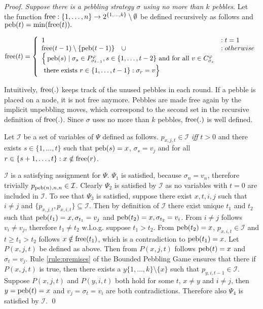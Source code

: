 \begin{proof}
\emph{Suppose there is a pebbling strategy $\sigma$ using no more than $k$ pebbles}. Let the function $\operatorname{free}: \{1,\ldots,n\} \rightarrow 2^{\{1,\ldots,k\}} \setminus \emptyset$ be defined recursively as follows and $\operatorname{peb}(t) = \min(\operatorname{free}(t)).$

$$
\operatorname{free}(t) = \left\{
  \begin{array}{ll}
    1 & : t = 1\\
    \operatorname{free}(t-1) \setminus \{\operatorname{peb}(t-1)\} \quad \cup & : otherwise\\
		\Big\{\operatorname{peb}(s) \mid \sigma_{s} \in P_{\sigma_{t-1}}^{\varphi}, s \in \{1,\ldots,t-2\} \text{ and for all } v \in C_{\sigma_{s}}^{\varphi}&\\
		\text{ there exists } r \in \{1,\ldots,t-1\}: \sigma_{r} = v \Big\}&
  \end{array}
\right.
$$

Intuitively, $\operatorname{free}(.)$ keeps track of the unused pebbles in each round.
If a pebble is placed on a node, it is not free anymore.
Pebbles are made free again by the implicit unpebbling moves, which correspond to the second set in the recursive definition of $\operatorname{free}(.)$.
Since $\sigma$ uses no more than $k$ pebbles, $\operatorname{free}(.)$ is well defined.

Let $\mathcal{I}$ be a set of variables of $\Psi$ defined as follows.
$p_{x,j,t} \in \mathcal{I}$ \emph{iff} $t > 0$ and there exists $s \in \{1,\ldots,t\}$ such that $\operatorname{peb}(s) = x$, $\sigma_s = v_j$ and for all $r \in \{s+1,\ldots,t\}: x \notin \operatorname{free}(r)$.

$\mathcal{I}$ is a satisfying assignment for $\Psi$.
$\Psi_1$ is satisfied, because $\sigma_n = v_n$, therefore trivially $p_{\operatorname{peb}(n),n,n} \in \mathcal{I}$.
Clearly $\Psi_2$ is satisfied by $\mathcal{I}$ as no variables with $t = 0$ are included in $\mathcal{I}$.
To see that $\Psi_3$ is satisfied, suppose there exist $x,t,i,j$ such that $i \neq j$ and $\{p_{x,j,t},p_{x,i,t}\} \subseteq \mathcal{I}$.
Then by definition of $\mathcal{I}$ there exist unique $t_1$ and $t_2$ such that $\operatorname{peb}(t_1) = x, \sigma_{t_1} = v_j$ and $\operatorname{peb}(t_2) = x, \sigma_{t_2} = v_i$.
From $i \neq j$ follows $v_i \neq v_j$, therefore $t_1 \neq t_2$ w.l.o.g. suppose $t_1 > t_2$.
From $\operatorname{peb}(t_2) = x$, $p_{x,i,t} \in \mathcal{I}$ and $t \geq t_1 > t_2$ follows $x \notin \operatorname{free}(t_1)$, which is a contradiction to $\operatorname{peb}(t_1) = x$.
Let $P(x,j,t)$ be defined as above. Then from $P(x,j,t)$ follows $\operatorname{peb}(t) = x$ and $\sigma_t = v_j$.
Rule \ref{rule:premises} of the Bounded Pebbling Game ensures that there if $P(x,j,t)$ is true, then there exists a $y \{1,\ldots,k\} \setminus \{x\}$ such that $p_{y,i,t-1} \in \mathcal{I}$.
Suppose $P(x,j,t)$ and $P(y,i,t)$ both hold for some $t$, $x \neq y$ and $i \neq j$, then $y = \operatorname{peb}(t) = x$ and $v_j = \sigma_t = v_i$ are both contradictions. 
Therefore also $\Psi_4$ is satisfied by $\mathcal{I}$.
\qed
\end{proof}